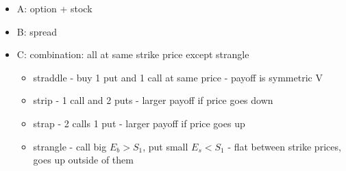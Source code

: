 \documentclass[]{amsart}
\begin{document}
\begin{itemize}

\item A: option + stock
\item B: spread 
\item C: combination: all at same strike price except strangle 
\begin{itemize}
\item straddle - buy 1 put and 1 call at same price - payoff is symmetric V
\item strip - 1 call and 2 puts - larger payoff if price goes down
\item strap - 2 calls 1 put - larger payoff if price goes up 
\item strangle - call big $E_b>S_1$, put small $E_s<S_1$ - flat between strike prices, goes up outside of them 

\end{itemize}


\end{itemize}
\end{document}
